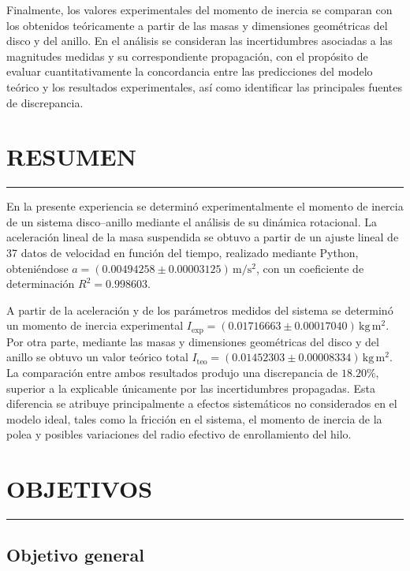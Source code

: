 \documentclass[11pt,a4paper]{article}
\newcommand{\sectionline}{%
    \vspace{-0.6em}
    \noindent\rule{\textwidth}{0.5pt}
    \vspace{0.5em}
}
\begin{document}
Finalmente, los valores experimentales del momento de inercia se comparan con
los obtenidos teóricamente a partir de las masas y dimensiones geométricas del
disco y del anillo. En el análisis se consideran las incertidumbres asociadas
a las magnitudes medidas y su correspondiente propagación, con el propósito
de evaluar cuantitativamente la concordancia entre las predicciones del modelo
teórico y los resultados experimentales, así como identificar las principales
fuentes de discrepancia.



\newpage
\section*{RESUMEN}
\sectionline

En la presente experiencia se determinó experimentalmente el momento de
inercia de un sistema disco--anillo mediante el análisis de su dinámica
rotacional. La aceleración lineal de la masa suspendida se obtuvo a partir
de un ajuste lineal de 37 datos de velocidad en función del tiempo,
realizado mediante Python, obteniéndose
\(a=(0.00494258\pm0.00003125)\,\mathrm{m/s^2}\), con un coeficiente de
determinación \(R^2=0.998603\).

A partir de la aceleración y de los parámetros medidos del sistema se
determinó un momento de inercia experimental
\(I_{\mathrm{exp}}=(0.01716663\pm0.00017040)\,\mathrm{kg\,m^2}\).
Por otra parte, mediante las masas y dimensiones geométricas del disco y
del anillo se obtuvo un valor teórico total
\(I_{\mathrm{teo}}=(0.01452303\pm0.00008334)\,\mathrm{kg\,m^2}\).
La comparación entre ambos resultados produjo una discrepancia de
\(18.20\%\), superior a la explicable únicamente por las incertidumbres
propagadas. Esta diferencia se atribuye principalmente a efectos
sistemáticos no considerados en el modelo ideal, tales como la fricción
en el sistema, el momento de inercia de la polea y posibles variaciones
del radio efectivo de enrollamiento del hilo.

\newpage

\section*{OBJETIVOS}
\sectionline

\subsection*{Objetivo general}
\end{document}
